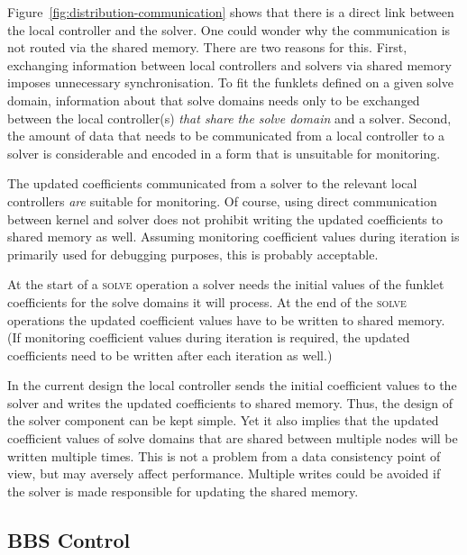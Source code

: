 \documentclass[10pt]{lofar}
\newcommand{\solve}{\textsc{solve}\xspace}
\begin{document}
Figure~\ref{fig:distribution-communication} shows that there is a direct link
between the local controller and the solver. One could wonder why the
communication is not routed via the shared memory. There are two reasons for
this. First, exchanging information between local controllers and solvers via
shared memory imposes unnecessary synchronisation. To fit the funklets defined
on a given solve domain, information about that solve domains needs only to be
exchanged between the local controller(s) \emph{that share the solve domain} and
a solver. Second, the amount of data that needs to be communicated from a local
controller to a solver is considerable and encoded in a form that is unsuitable
for monitoring.

The updated coefficients communicated from a solver to the relevant local
controllers \emph{are} suitable for monitoring. Of course, using direct
communication between kernel and solver does not prohibit writing the updated
coefficients to shared memory as well. Assuming monitoring coefficient values
during iteration is primarily used for debugging purposes, this is probably
acceptable.

At the start of a \solve operation a solver needs the initial values of the
funklet coefficients for the solve domains it will process. At the end of the
\solve operations the updated coefficient values have to be written to shared
memory. (If monitoring coefficient values during iteration is required, the
updated coefficients need to be written after each iteration as well.)

In the current design the local controller sends the initial coefficient values
to the solver and writes the updated coefficients to shared memory. Thus, the
design of the solver component can be kept simple. Yet it also implies that the
updated coefficient values of solve domains that are shared between multiple
nodes will be written multiple times. This is not a problem from a data
consistency point of view, but may aversely affect performance. Multiple writes
could be avoided if the solver is made responsible for updating the shared
memory.

\subsection{BBS Control}
\label{subsec:design-control}
\end{document}
